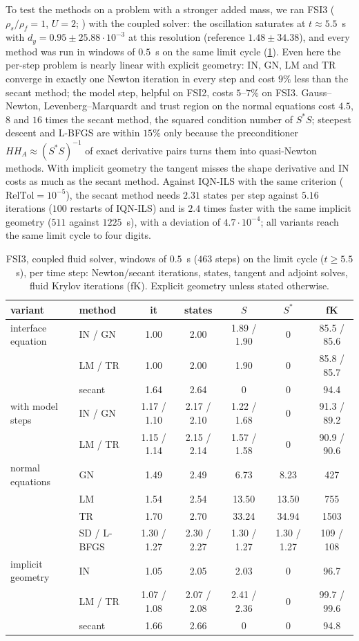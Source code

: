 \documentclass[11pt,a4paper]{article}
\theoremstyle{definition}
\theoremstyle{remark}
\begin{document}
To test the methods on a problem with a stronger added mass, we ran FSI3 ($\rho_s/\rho_f=1$, $U=2$;
) with the coupled solver: the oscillation saturates at
$t\approx5.5$~s with $d_y=0.95\pm25.88\cdot10^{-3}$ at this resolution (reference
$1.48\pm34.38$), and every method was run in windows of $0.5$~s on the same limit cycle
(\cref{tab:fsi3}). Even here the per-step problem is nearly linear with explicit geometry: IN, GN,
LM and TR converge in exactly one Newton iteration in every step and cost $9\%$ less than the
secant method; the model step, helpful on FSI2, costs $5$--$7\%$ on FSI3. Gauss--Newton,
Levenberg--Marquardt and trust region on the normal equations cost $4.5$, $8$ and $16$ times the
secant method, the squared condition number of $S^*S$; steepest descent and L-BFGS are within
$15\%$ only because the preconditioner $HH_A\approx(S^*S)^{-1}$ of exact derivative pairs turns them
into quasi-Newton methods. With implicit geometry the tangent misses the shape derivative and IN
costs as much as the secant method. Against IQN-ILS with the same criterion
($\mathrm{RelTol}=10^{-5}$), the secant method needs $2.31$ states per step against $5.16$
iterations ($100$ restarts of IQN-ILS) and is $2.4$ times faster with the same implicit geometry
($511$ against $1225$~s), with a deviation of $4.7\cdot10^{-4}$; all variants reach the same limit
cycle to four digits.

\begin{table}[ht]\centering
\caption{FSI3, coupled fluid solver, windows of $0.5$~s ($463$ steps) on the limit cycle
($t\ge5.5$~s), per time step: Newton/secant iterations, states, tangent and adjoint solves, fluid
Krylov iterations (fK). Explicit geometry unless stated otherwise.}\label{tab:fsi3}
\begin{tabular}{llccccc}
\toprule
variant & method & it & states & $S$ & $S^*$ & fK\\
\midrule
interface equation & IN / GN & 1.00 & 2.00 & 1.89 / 1.90 & 0 & 85.5 / 85.6\\
 & LM / TR & 1.00 & 2.00 & 1.90 & 0 & 85.8 / 85.7\\
 & secant & 1.64 & 2.64 & 0 & 0 & 94.4\\
with model steps & IN / GN & 1.17 / 1.10 & 2.17 / 2.10 & 1.22 / 1.68 & 0 & 91.3 / 89.2\\
 & LM / TR & 1.15 / 1.14 & 2.15 / 2.14 & 1.57 / 1.58 & 0 & 90.9 / 90.6\\
normal equations & GN & 1.49 & 2.49 & 6.73 & 8.23 & 427\\
 & LM & 1.54 & 2.54 & 13.50 & 13.50 & 755\\
 & TR & 1.70 & 2.70 & 33.24 & 34.94 & 1503\\
 & SD / L-BFGS & 1.30 / 1.27 & 2.30 / 2.27 & 1.30 / 1.27 & 1.30 / 1.27 & 109 / 108\\
implicit geometry & IN & 1.05 & 2.05 & 2.03 & 0 & 96.7\\
 & LM / TR & 1.07 / 1.08 & 2.07 / 2.08 & 2.41 / 2.36 & 0 & 99.7 / 99.6\\
 & secant & 1.66 & 2.66 & 0 & 0 & 94.8\\
\bottomrule
\end{tabular}
\end{table}
\end{document}
